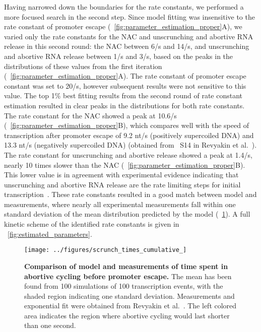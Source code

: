 Having narrowed down the boundaries for the rate constants, we performed a
more focused search in the second step. Since model fitting was insensitive to
the rate constant of promoter escape
(\FIG~\ref{fig:parameter_estimation_proper}A), we varied only the rate
constants for the NAC and unscrunching and abortive RNA release in this second
round: the NAC between 6/s and 14/s, and unscrunching and
abortive RNA release between 1/s and 3/s, based on the peaks in
the distributions of these values from the first iteration
(\FIG~\ref{fig:parameter_estimation_proper}A). The rate constant of promoter
escape constant was set to 20/s, however subsequent results were not
sensitive to this value. The top 1\% best fitting results from the second
round of rate constant estimation resulted in clear peaks in the distributions
for both rate constants. The rate constant for the NAC showed a peak at 10.6/s
(\FIG~\ref{fig:parameter_estimation_proper}B), which compares well with the
speed of transcription after promoter escape of 9.2 nt/s (positively
supercoiled DNA) and 13.3 nt/s (negatively supercoiled DNA) (obtained from
\FIG~S14 in Revyakin et al.\ \cite{revyakin_abortive_2006}). The rate constant
for unscrunching and abortive release showed a peak at 1.4/s, nearly 10 times
slower than the NAC (\FIG~\ref{fig:parameter_estimation_proper}B). This lower
value is in agreement with experimental evidence indicating that unscrunching
and abortive RNA release are the rate limiting steps for initial
transcription~\cite{revyakin_abortive_2006, margeat_direct_2006}. These rate
constants resulted in a good match between model and measurements, where
nearly all experimental measurements fall within one standard deviation of the
mean distribution predicted by the model (\FIG~\ref{fig:revyakin_fit}). A full
kinetic scheme of the identified rate constants is given in
\FIG~\ref{fig:estimated_parameters}.

\begin{figure}[h]
    \begin{center}
      \texttt{[image: ../figures/scrunch\_times\_cumulative\_]}
    \end{center}
  \caption{{\bf Comparison of model and measurements of time spent in abortive
        cycling before promoter escape.} The mean has been found from 100
        simulations of 100 transcription events, with the shaded region
        indicating one standard deviation. Measurements and exponential fit
        were obtained from Revyakin et al.\ \cite{revyakin_abortive_2006}. The
        left colored area indicates the region where abortive cycling would last
        shorter than one second.}
\label{fig:revyakin_fit}
\end{figure}

